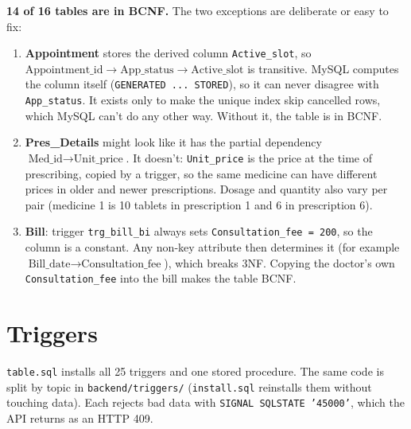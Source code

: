 \documentclass[11pt,a4paper]{article}
\newcommand{\code}[1]{\texttt{#1}}
\begin{document}
\textbf{14 of 16 tables are in BCNF.} The two exceptions are deliberate or easy to fix:

\begin{enumerate}
  \item \textbf{Appointment} stores the derived column \code{Active\_slot}, so $\text{Appointment\_id} \rightarrow \text{App\_status} \rightarrow \text{Active\_slot}$ is transitive. MySQL computes the column itself (\code{GENERATED ... STORED}), so it can never disagree with \code{App\_status}. It exists only to make the unique index skip cancelled rows, which MySQL can't do any other way. Without it, the table is in BCNF.
  \item \textbf{Pres\_Details} might look like it has the partial dependency $\text{Med\_id} \rightarrow \text{Unit\_price}$. It doesn't: \code{Unit\_price} is the price at the time of prescribing, copied by a trigger, so the same medicine can have different prices in older and newer prescriptions. Dosage and quantity also vary per pair (medicine 1 is 10 tablets in prescription 1 and 6 in prescription 6).
  \item \textbf{Bill}: trigger \code{trg\_bill\_bi} always sets \code{Consultation\_fee = 200}, so the column is a constant. Any non-key attribute then determines it (for example $\text{Bill\_date} \rightarrow \text{Consultation\_fee}$), which breaks 3NF. Copying the doctor's own \code{Consultation\_fee} into the bill makes the table BCNF.
\end{enumerate}

\section{Triggers}

\code{table.sql} installs all 25 triggers and one stored procedure. The same code is split by topic in \code{backend/triggers/} (\code{install.sql} reinstalls them without touching data). Each rejects bad data with \code{SIGNAL SQLSTATE '45000'}, which the API returns as an HTTP 409.
\end{document}
